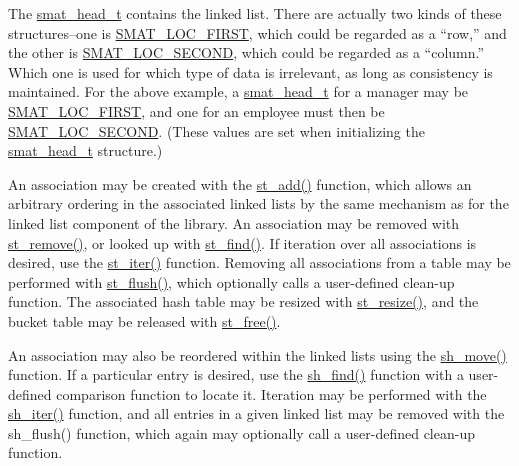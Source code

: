 The \hyperlink{group__dbprim__smat_a1}{smat\_\-head\_\-t} contains the linked list. There are actually two kinds of these structures--one is \hyperlink{group__dbprim__smat_a47a135}{SMAT\_\-LOC\_\-FIRST}, which could be regarded as a ``row,'' and the other is \hyperlink{group__dbprim__smat_a47a136}{SMAT\_\-LOC\_\-SECOND}, which could be regarded as a ``column.'' Which one is used for which type of data is irrelevant, as long as consistency is maintained. For the above example, a \hyperlink{group__dbprim__smat_a1}{smat\_\-head\_\-t} for a manager may be \hyperlink{group__dbprim__smat_a47a135}{SMAT\_\-LOC\_\-FIRST}, and one for an employee must then be \hyperlink{group__dbprim__smat_a47a136}{SMAT\_\-LOC\_\-SECOND}. (These values are set when initializing the \hyperlink{group__dbprim__smat_a1}{smat\_\-head\_\-t} structure.)

An association may be created with the \hyperlink{group__dbprim__smat_a10}{st\_\-add()} function, which allows an arbitrary ordering in the associated linked lists by the same mechanism as for the linked list component of the library. An association may be removed with \hyperlink{group__dbprim__smat_a11}{st\_\-remove()}, or looked up with \hyperlink{group__dbprim__smat_a12}{st\_\-find()}. If iteration over all associations is desired, use the \hyperlink{group__dbprim__smat_a13}{st\_\-iter()} function. Removing all associations from a table may be performed with \hyperlink{group__dbprim__smat_a14}{st\_\-flush()}, which optionally calls a user-defined clean-up function. The associated hash table may be resized with \hyperlink{group__dbprim__smat_a15}{st\_\-resize()}, and the bucket table may be released with \hyperlink{group__dbprim__smat_a16}{st\_\-free()}.

An association may also be reordered within the linked lists using the \hyperlink{group__dbprim__smat_a18}{sh\_\-move()} function. If a particular entry is desired, use the \hyperlink{group__dbprim__smat_a19}{sh\_\-find()} function with a user-defined comparison function to locate it. Iteration may be performed with the \hyperlink{group__dbprim__smat_a20}{sh\_\-iter()} function, and all entries in a given linked list may be removed with the sh\_\-flush() function, which again may optionally call a user-defined clean-up function. 

